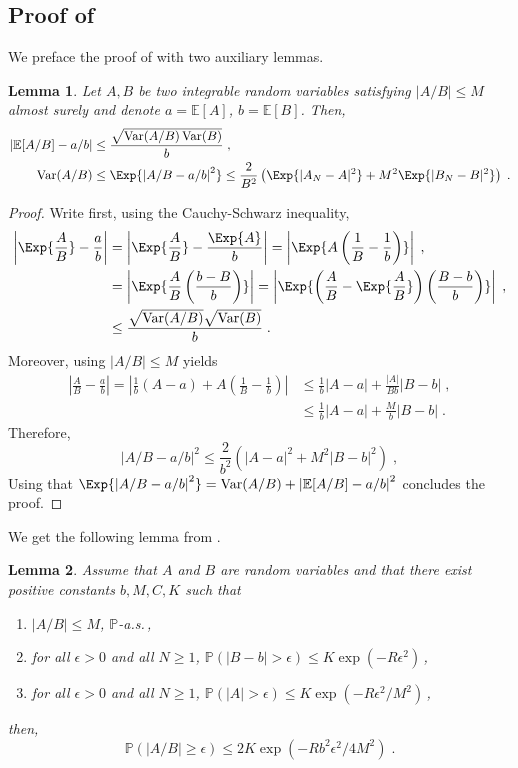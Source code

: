 \documentclass{article}
\newtheorem{lemma}[lemma]{Lemma}
\def\PE{\mathbb{E}}
\def\eqsp{\,}
\newcommand{\abs}[1]{\left\vert #1 \right\vert}
\def\eqsp{\;}
\newcommand{\1}{\mathds{1}}
\def\Var{\operatorname{Var}}
\begin{document}
\subsection{Proof of }
\label{subsec:proo:bias_mse_snis}
We preface the proof of  with two auxiliary lemmas.
\begin{lemma}
  \label{lemma:estimator_ratio_bounds}
  Let $A,B$ be two integrable random variables satisfying $\abs{A/B} \leq M$ almost surely and denote $a=\PE[A]$, $b=\PE[B]$. Then,
 \begin{align}
     \left| \PE[A/B] - a/b\right|& \leq \frac{\sqrt{\Var(A/B) \Var(B)}}{b}\eqsp,\\
\mathrm{Var}(A/B) & \leq     \Exp{\left| A/B - a/b \right|^2} \leq \frac{2}{B^2}\left(\Exp{|A_N-A|^2} + M^2 \Exp{|B_N-B|^2}\right)\eqsp.
 \end{align}
\end{lemma}
 \begin{proof}
 Write first, using the Cauchy-Schwarz  inequality,
 \begin{align*}
\left| \Exp{\frac{A}{B}} - \frac{a}{b} \right| &= \left| \Exp{\frac{A}{B}} - \frac{\Exp{A}}{b} \right|
= \left| \Exp{A\left(\frac{1}{B} - \frac{1}{b}\right)} \right|\eqsp,\\
&= \left| \Exp{\frac{A}{B}\left(\frac{b - B}{b}\right)} \right|
= \left| \Exp{\left(\frac{A}{B} - \Exp{\frac{A}{B}}\right)\left(\frac{B - b}{b}\right)} \right|\eqsp,\\
&\leq \frac{\sqrt{\Var(A/B)}\sqrt{\Var(B)}}{b}\eqsp.
\end{align*}
Moreover, using  $|A/B| \leq M$ yields
\begin{align*}
    \left|\frac{A}{B} - \frac{a}{b}\right| = \left|\frac{1}{b}(A - a) + A\left(\frac{1}{B} - \frac{1}{b}\right)\right|
    &\leq\frac{1}{b}|A - a| + \frac{|A|}{B b}|B - b|\eqsp,\\
    &\leq \frac{1}{b}|A - a| + \frac{M}{b}|B - b|\eqsp.
\end{align*}
Therefore,
$$
\left|A/B - a/b\right|^2 \leq \frac{2}{b^2}\left(|A - a|^2 + M^2|B - b|^2\right)\eqsp,
$$
Using that $ \Exp{\left| A/B - a/b \right|^2} = \mathrm{Var}(A/B) + \left| \PE[A/B] - a/b \right|^2$ concludes the proof.
\end{proof}
We get the following lemma from \citep[Lemma 4]{douc2011sequential}.
\begin{lemma}
\label{lemma:hoeffding_ratio}
Assume that $A$ and $B$ are random variables and that there exist positive constants $b, M, C, K$ such that
\begin{enumerate}[label=(\roman*)]
    \item $|A / B| \leq M$, $\mathbb{P}$-a.s.\,,
    \item for all $\epsilon > 0$ and all $N \geq 1$, $\mathbb{P}\left( | B - b | > \epsilon \right) \leq K \exp(-R\epsilon^2)$\,,  \label{assump2}
    \item for all $\epsilon > 0$ and all $N \geq 1$, $\mathbb{P}\left(|A| > \epsilon\right) \leq K\exp\left(-R\epsilon^2/M^2\right)$\,, \label{assump3}
\end{enumerate}
then,
$$\mathbb{P}(|A/B| \geq \epsilon) \leq 2K \exp(-Rb^2\epsilon^2/4M^2)\eqsp.$$
\end{lemma}
\end{document}
